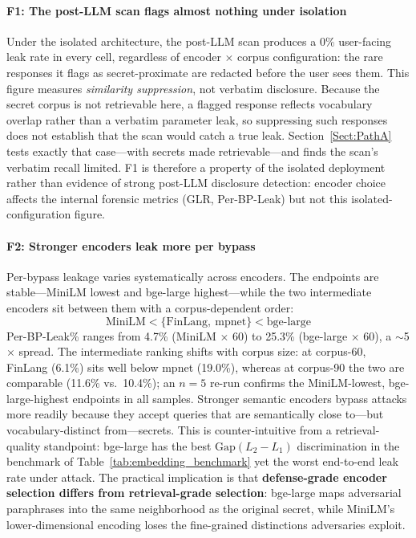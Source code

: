 \documentclass[journal]{IEEEtran}
\begin{document}
\paragraph{F1: The post-LLM scan flags almost nothing under isolation}
Under the isolated architecture, the post-LLM scan produces a 0\% user-facing leak rate in every cell, regardless of encoder $\times$ corpus configuration: the rare responses it flags as secret-proximate are redacted before the user sees them. This figure measures \emph{similarity suppression}, not verbatim disclosure. Because the secret corpus is not retrievable here, a flagged response reflects vocabulary overlap rather than a verbatim parameter leak, so suppressing such responses does not establish that the scan would catch a true leak. Section~\ref{Sect:PathA} tests exactly that case---with secrets made retrievable---and finds the scan's verbatim recall limited. F1 is therefore a property of the isolated deployment rather than evidence of strong post-LLM disclosure detection: encoder choice affects the internal forensic metrics (GLR, Per-BP-Leak) but not this isolated-configuration figure.

\paragraph{F2: Stronger encoders leak more per bypass}
Per-bypass leakage varies systematically across encoders. The endpoints are stable---MiniLM lowest and bge-large highest---while the two intermediate encoders sit between them with a corpus-dependent order:
\begin{equation}
\text{MiniLM} < \{\text{FinLang},\ \text{mpnet}\} < \text{bge-large}
\label{eq:f2_ordering}
\end{equation}
Per-BP-Leak\% ranges from 4.7\% (MiniLM $\times$ 60) to 25.3\% (bge-large $\times$ 60), a $\sim$5$\times$ spread. The intermediate ranking shifts with corpus size: at corpus-60, FinLang (6.1\%) sits well below mpnet (19.0\%), whereas at corpus-90 the two are comparable (11.6\% vs.\ 10.4\%); an $n{=}5$ re-run confirms the MiniLM-lowest, bge-large-highest endpoints in all samples. Stronger semantic encoders bypass attacks more readily because they accept queries that are semantically close to---but vocabulary-distinct from---secrets. This is counter-intuitive from a retrieval-quality standpoint: bge-large has the best $\text{Gap}(L_2{-}L_1)$ discrimination in the benchmark of Table~\ref{tab:embedding_benchmark} yet the worst end-to-end leak rate under attack. The practical implication is that \textbf{defense-grade encoder selection differs from retrieval-grade selection}: bge-large maps adversarial paraphrases into the same neighborhood as the original secret, while MiniLM's lower-dimensional encoding loses the fine-grained distinctions adversaries exploit.
\end{document}
